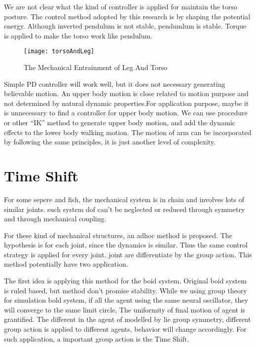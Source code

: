 {We are not clear what the kind of controller is applied for maintain the torso posture.
The control method adopted by this research is by shaping the potential energy.
Although inverted pendulum is not stable, pendumlum is stable.
Torque is applied to make the torso work like pendulum.

\begin{figure}[!htbp]
  \begin{center}
      \texttt{[image: torsoAndLeg]}
    \caption{The Mechanical Entrainment of Leg And Torso}
    \label{fig:torsolegentrainment}
\end{center}
\end{figure}



Simple PD controller will work well, but it does not necessary generating believable motion.
An upper body motion is close related to motion purpose and not determined by natural dynamic properties.For application purpose, maybe it is unnecessary to find a controller for upper body motion.
We can use procedure or other ``IK'' method to generate upper body motion, and add the dynamic effects to the lower body walking motion.
The motion of arm can be incorporated by following the same principles, it is just another level of complexity.


\section{Time Shift}

For some sepere and fish, the mechanical system is in chain and involves lots of similar joints.
such system dof can't be neglected or reduced through symmetry and through mechanical coupling.

For these kind of mechanical structures, an adhoc method is proposed.
The hypothesis is for each joint, since the dynamics is similar.
Thus the same control strategy is applied for every joint.
joint are differentiate by the group action.
This method potentially have two application.


The first idea is applying this method for the boid system.
Original boid system is ruled based, but method don't promise stability.
While we using group theory for simulation bold system, if all the agent using the same neural oscillator, they will converge to the same limit circle,
The uniformity of final motion of agent is grantified.
The different in the agent of modelled by lie group symmetry, different group action is applied to different agents, behavior will change accordingly.
For such application, a important group action is the Time Shift.



}
